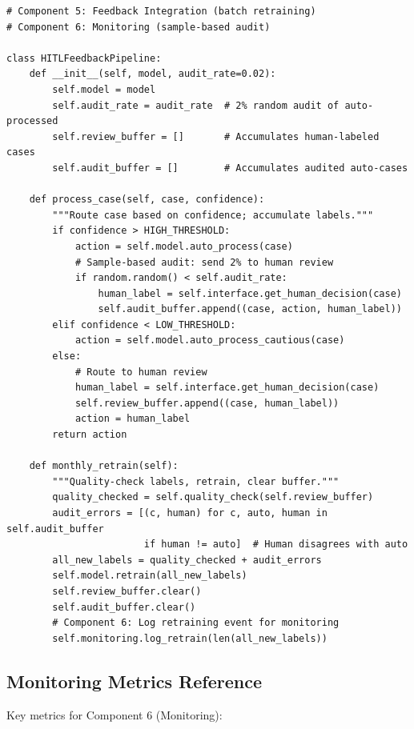 \begin{lstlisting}[style=python, caption={Batch retraining with sample-based audit}, label={lst:batch-retrain}]
# Component 5: Feedback Integration (batch retraining)
# Component 6: Monitoring (sample-based audit)

class HITLFeedbackPipeline:
    def __init__(self, model, audit_rate=0.02):
        self.model = model
        self.audit_rate = audit_rate  # 2% random audit of auto-processed
        self.review_buffer = []       # Accumulates human-labeled cases
        self.audit_buffer = []        # Accumulates audited auto-cases

    def process_case(self, case, confidence):
        """Route case based on confidence; accumulate labels."""
        if confidence > HIGH_THRESHOLD:
            action = self.model.auto_process(case)
            # Sample-based audit: send 2% to human review
            if random.random() < self.audit_rate:
                human_label = self.interface.get_human_decision(case)
                self.audit_buffer.append((case, action, human_label))
        elif confidence < LOW_THRESHOLD:
            action = self.model.auto_process_cautious(case)
        else:
            # Route to human review
            human_label = self.interface.get_human_decision(case)
            self.review_buffer.append((case, human_label))
            action = human_label
        return action

    def monthly_retrain(self):
        """Quality-check labels, retrain, clear buffer."""
        quality_checked = self.quality_check(self.review_buffer)
        audit_errors = [(c, human) for c, auto, human in self.audit_buffer
                        if human != auto]  # Human disagrees with auto
        all_new_labels = quality_checked + audit_errors
        self.model.retrain(all_new_labels)
        self.review_buffer.clear()
        self.audit_buffer.clear()
        # Component 6: Log retraining event for monitoring
        self.monitoring.log_retrain(len(all_new_labels))
\end{lstlisting}

\subsection{Monitoring Metrics Reference}

Key metrics for Component 6 (Monitoring):

